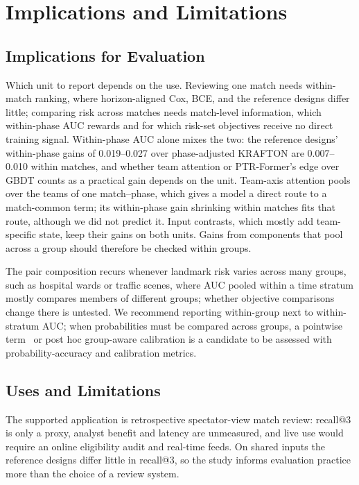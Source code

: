 \documentclass[sigconf,anonymous]{acmart}
\begin{document}
\section{Implications and Limitations}
\label{sec:discussion}
\subsection{Implications for Evaluation}
\label{sec:discussion:implications}
Which unit to report depends on the use. Reviewing one match needs within-match ranking, where horizon-aligned Cox, BCE, and the reference designs differ little; comparing risk across matches needs match-level information, which within-phase AUC rewards and for which risk-set objectives receive no direct training signal. Within-phase AUC alone mixes the two: the reference designs' within-phase gains of 0.019--0.027 over phase-adjusted KRAFTON are 0.007--0.010 within matches, and whether team attention or PTR-Former's edge over GBDT counts as a practical gain depends on the unit. Team-axis attention pools over the teams of one match--phase, which gives a model a direct route to a match-common term; its within-phase gain shrinking within matches fits that route, although we did not predict it. Input contrasts, which mostly add team-specific state, keep their gains on both units. Gains from components that pool across a group should therefore be checked within groups.

The pair composition recurs whenever landmark risk varies across many groups, such as hospital wards or traffic scenes, where AUC pooled within a time stratum mostly compares members of different groups; whether objective comparisons change there is untested. We recommend reporting within-group next to within-stratum AUC; when probabilities must be compared across groups, a pointwise term~\cite{Bai23} or post hoc group-aware calibration is a candidate to be assessed with probability-accuracy and calibration metrics.

\subsection{Uses and Limitations}
\label{sec:discussion:limits}
The supported application is retrospective spectator-view match review: recall@3 is only a proxy, analyst benefit and latency are unmeasured, and live use would require an online eligibility audit and real-time feeds. On shared inputs the reference designs differ little in recall@3, so the study informs evaluation practice more than the choice of a review system.
\end{document}
